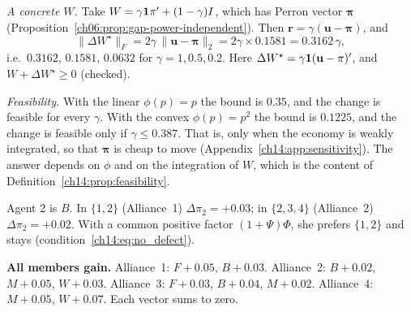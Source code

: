 \documentclass[../solutions_manual.tex]{subfiles}
\begin{document}
\emph{A concrete $W$.} Take $W = \gamma\mathbf{1}\pi' + (1-\gamma)I$, which has Perron vector $\boldsymbol{\pi}$ (Proposition~\ref{ch06:prop:gap-power-independent}). Then $\mathbf{r} = \gamma(\mathbf{u} - \boldsymbol{\pi})$, and
\[
\|\Delta W^\star\|_F = 2\gamma\,\|\mathbf{u} - \boldsymbol{\pi}\|_2 = 2\gamma\times 0.1581 = 0.3162\,\gamma ,
\]
i.e.\ $0.3162$, $0.1581$, $0.0632$ for $\gamma = 1, 0.5, 0.2$. Here $\Delta W^\star = \gamma\mathbf{1}(\mathbf{u} - \pi)'$, and $W + \Delta W^\star \ge 0$ (checked).

\emph{Feasibility.} With the linear $\phi(p) = p$ the bound is $0.35$, and the change is feasible for every $\gamma$. With the convex $\phi(p) = p^2$ the bound is $0.1225$, and the change is feasible only if $\gamma \le 0.387$. That is, only when the economy is weakly integrated, so that $\boldsymbol{\pi}$ is cheap to move (Appendix~\ref{ch14:app:sensitivity}). The answer depends on $\phi$ and on the integration of $W$, which is the content of Definition~\ref{ch14:prop:feasibility}.

 Agent 2 is $B$. In $\{1,2\}$ (Alliance~1) $\Delta\pi_2 = +0.03$; in $\{2,3,4\}$ (Alliance~2) $\Delta\pi_2 = +0.02$. With a common positive factor $(1+\Psi)\Phi$, she prefers $\{1,2\}$ and stays (condition~\eqref{ch14:eq:no_defect}).

\textbf{All members gain.} Alliance~1: $F{+}0.05$, $B{+}0.03$. Alliance~2: $B{+}0.02$, $M{+}0.05$, $W{+}0.03$. Alliance~3: $F{+}0.03$, $B{+}0.04$, $M{+}0.02$. Alliance~4: $M{+}0.05$, $W{+}0.07$. Each vector sums to zero.
\end{document}
